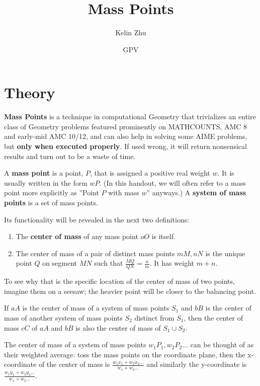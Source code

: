 \documentclass[mast]{lucky}
\title{Mass Points}
\author{Kelin Zhu}
\date{GPV}
\begin{document}
\maketitle
\section{Theory}
\textbf{Mass Points} is a technique in computational Geometry that trivializes an entire class of Geometry problems featured prominently on MATHCOUNTS, AMC 8 and early-mid AMC 10/12, and can also help in solving some AIME problems, but \textbf{only when executed properly}. If used wrong, it will return nonsensical results and turn out to be a waste of time.
\begin{defi}
A \textbf{mass point} is a point, $P$, that is assigned a positive real weight $w$. It is usually written in the form $wP$. (In this handout, we will often refer to a mass point more explicitly as ''Point $P$ with mass $w$'' anyways.) A \textbf{system of mass points} is a set of mass points.
\end{defi}
Its functionality will be revealed in the next two definitions:
\begin{defi}

\begin{enumerate}
\item The \textbf{center of mass} of any mass point $oO$ is itself.
\item The center of mass of a pair of distinct mass points $mM,nN$ is the unique point $Q$ on segment $MN$ such that $\frac{MQ}{QN}=\frac{n}{m}$. It has weight $m+n$.
\end{enumerate}
\end{defi}
To see why that is the specific location of the center of mass of two points, imagine them on a seesaw; the heavier point will be closer to the balancing point.
\begin{defi}

If $aA$ is the center of mass of a system of mass points $S_1$ and $bB$ is the center of mass of another system of mass points $S_2$ distinct from $S_1$, then the center of mass $cC$ of $aA$ and $bB$ is also the center of mass of $S_1\cup S_2$.

The center of mass of a system of mass points $w_1P_1,w_2P_2\ldots$ can be thought of as their weighted average: toss the mass points on the coordinate plane, then the x-coordinate of the center of mass is $\frac{w_1x_1+w_2x_2\ldots}{w_1+w_2\ldots}$ and similarly the y-coordinate is $\frac{w_1y_1+w_2y_2\ldots}{w_1+w_2\ldots}$.
\end{defi}
\end{document}
